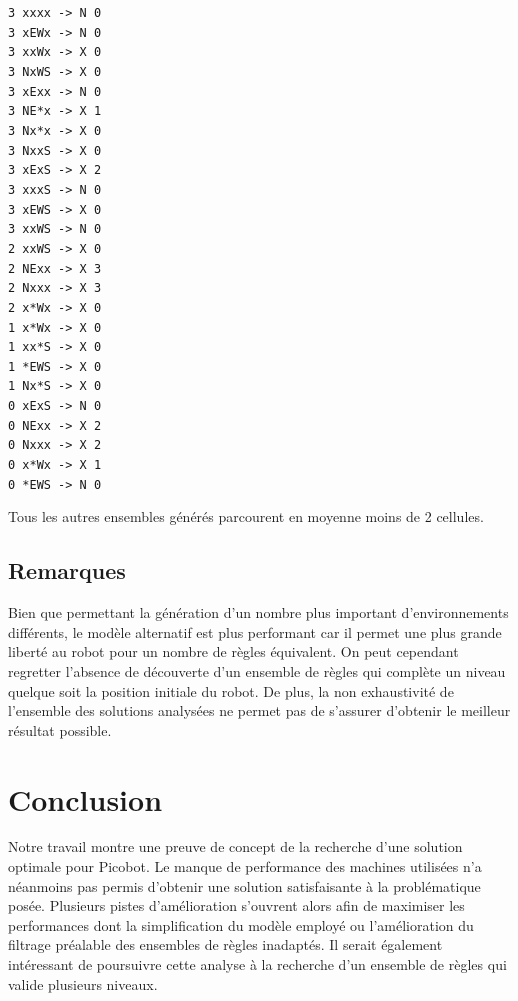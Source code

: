 \documentclass{article}
\begin{document}
\begin{center}
\texttt{3 xxxx -> N 0  \\
3 xEWx -> N 0  \\
3 xxWx -> X 0  \\
3 NxWS -> X 0  \\
3 xExx -> N 0  \\
3 NE*x -> X 1  \\
3 Nx*x -> X 0  \\
3 NxxS -> X 0  \\
3 xExS -> X 2  \\
3 xxxS -> N 0  \\
3 xEWS -> X 0  \\
3 xxWS -> N 0  \\
2 xxWS -> X 0  \\
2 NExx -> X 3  \\
2 Nxxx -> X 3  \\
2 x*Wx -> X 0  \\
1 x*Wx -> X 0  \\
1 xx*S -> X 0  \\
1 *EWS -> X 0  \\
1 Nx*S -> X 0  \\
0 xExS -> N 0  \\
0 NExx -> X 2  \\
0 Nxxx -> X 2  \\
0 x*Wx -> X 1  \\
0 *EWS -> N 0
}
\end{center}

Tous les autres ensembles générés parcourent en moyenne moins de 2
cellules.

\subsection{Remarques}

Bien que permettant la génération d’un nombre plus important
d’environnements différents, le modèle alternatif est plus performant
car il permet une plus grande liberté au robot pour un nombre de
règles équivalent. On peut cependant regretter l’absence de découverte
d’un ensemble de règles qui complète un niveau quelque soit la
position initiale du robot. De plus, la non exhaustivité de l’ensemble
des solutions analysées ne permet pas de s’assurer d’obtenir le
meilleur résultat possible.

\section{Conclusion}
\label{sec:conclusion}
Notre travail montre une preuve de concept de la recherche d’une
solution optimale pour Picobot. Le manque de performance des machines
utilisées n’a néanmoins pas permis d’obtenir une solution
satisfaisante à la problématique posée. Plusieurs pistes
d’amélioration s’ouvrent alors afin de maximiser les performances dont
la simplification du modèle employé ou l’amélioration du filtrage
préalable des ensembles de règles inadaptés. Il serait également
intéressant de poursuivre cette analyse à la recherche d’un ensemble
de règles qui valide plusieurs niveaux.
\end{document}
